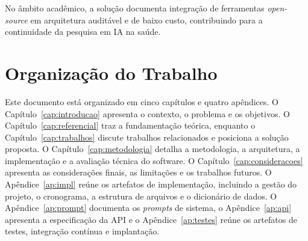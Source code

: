 No âmbito acadêmico, a solução documenta integração de ferramentas \textit{open-source} em
arquitetura auditável e de baixo custo, contribuindo para a continuidade da pesquisa em IA na
saúde.

\section{Organização do Trabalho}

Este documento está organizado em cinco capítulos e quatro apêndices. O Capítulo~\ref{cap:introducao}
apresenta o contexto, o problema e os objetivos. O Capítulo~\ref{cap:referencial} traz a fundamentação
teórica, enquanto o Capítulo~\ref{cap:trabalhos} discute trabalhos relacionados e posiciona a solução
proposta. O Capítulo~\ref{cap:metodologia} detalha a metodologia, a arquitetura, a implementação e a
avaliação técnica do software. O Capítulo~\ref{cap:consideracoes} apresenta as considerações
finais, as limitações e os trabalhos futuros. O Apêndice~\ref{ap:impl} reúne os artefatos de implementação,
incluindo a gestão do projeto, o cronograma, a estrutura de arquivos e o dicionário de dados. O Apêndice~\ref{ap:prompt}
documenta os \textit{prompts} de sistema, o Apêndice~\ref{ap:api} apresenta a especificação da API e o
Apêndice~\ref{ap:testes} reúne os artefatos de testes, integração contínua e implantação.
